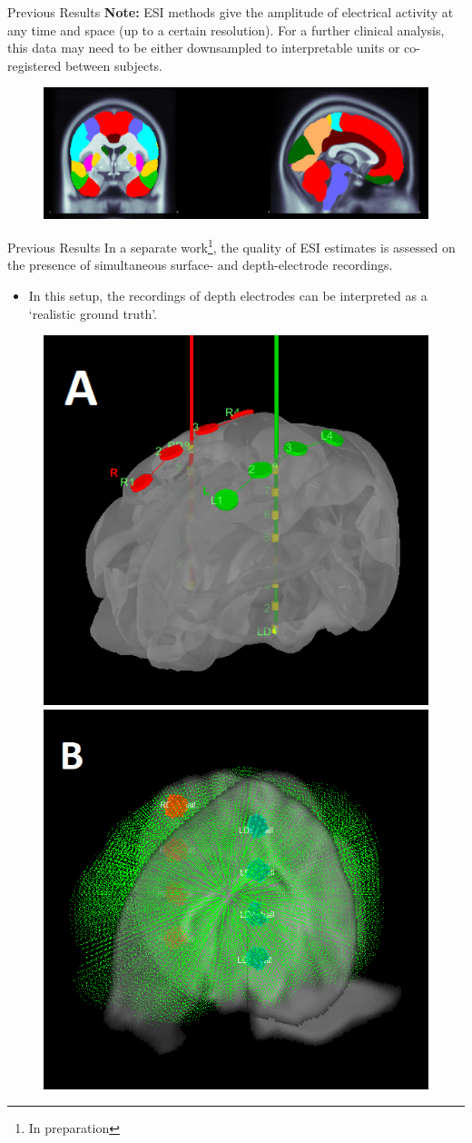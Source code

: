 \documentclass[progressbar=head]{beamer}
\begin{document}
\begin{frame}{Previous Results}
\textbf{Note:} ESI methods give the amplitude of electrical activity at any time and space (up to a certain resolution). 
For a 
further clinical analysis,
this data may need to be either downsampled to interpretable units or co-registered between subjects.

\begin{figure}
\centering
\includegraphics[width=0.9\linewidth]{./img_oldbeamer/MriViewer_Subject02_protocol1_LPBA40_v2}
\end{figure}
\end{frame}

\begin{frame}{Previous Results}
In a separate work\footnote{In preparation}, the quality of ESI estimates is assessed on the presence of 
%
simultaneous surface- and depth-electrode recordings.
\begin{itemize}
\item In this setup, the recordings of depth electrodes can be interpreted as a
`realistic ground truth'.
\end{itemize}
%

\begin{figure}
\centering
\includegraphics[width=0.35\linewidth]{./img_oldbeamer/positions02_v2}
\includegraphics[width=0.35\linewidth]{./img_oldbeamer/positions01_v2}
\end{figure}
\end{frame}
\end{document}
